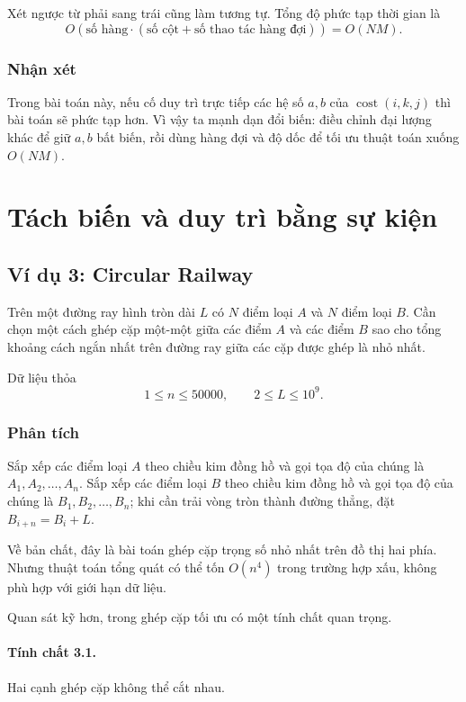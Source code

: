 \documentclass[11pt]{article}
\begin{document}
Xét ngược từ phải sang trái cũng làm tương tự. Tổng độ phức tạp thời gian là
\[
  O(\text{số hàng}\cdot(\text{số cột}+\text{số thao tác hàng đợi}))=O(NM).
\]

\subsubsection*{Nhận xét}

Trong bài toán này, nếu cố duy trì trực tiếp các hệ số $a,b$ của
$\operatorname{cost}(i,k,j)$ thì bài toán sẽ phức tạp hơn. Vì vậy ta mạnh dạn
đổi biến: điều chỉnh đại lượng khác để giữ $a,b$ bất biến, rồi dùng hàng đợi
và độ dốc để tối ưu thuật toán xuống $O(NM)$.

\section{Tách biến và duy trì bằng sự kiện}

\subsection{Ví dụ 3: Circular Railway}

Trên một đường ray hình tròn dài $L$ có $N$ điểm loại $A$ và $N$ điểm loại
$B$. Cần chọn một cách ghép cặp một-một giữa các điểm $A$ và các điểm $B$ sao
cho tổng khoảng cách ngắn nhất trên đường ray giữa các cặp được ghép là nhỏ
nhất.

Dữ liệu thỏa
\[
  1\le n\le 50000,\qquad 2\le L\le 10^9.
\]

\subsubsection*{Phân tích}

Sắp xếp các điểm loại $A$ theo chiều kim đồng hồ và gọi tọa độ của chúng là
$A_1,A_2,\ldots,A_n$. Sắp xếp các điểm loại $B$ theo chiều kim đồng hồ và gọi
tọa độ của chúng là $B_1,B_2,\ldots,B_n$; khi cần trải vòng tròn thành đường
thẳng, đặt $B_{i+n}=B_i+L$.

Về bản chất, đây là bài toán ghép cặp trọng số nhỏ nhất trên đồ thị hai phía.
Nhưng thuật toán tổng quát có thể tốn $O(n^4)$ trong trường hợp xấu, không phù
hợp với giới hạn dữ liệu.

Quan sát kỹ hơn, trong ghép cặp tối ưu có một tính chất quan trọng.

\paragraph{Tính chất 3.1.}
Hai cạnh ghép cặp không thể cắt nhau.
\end{document}
